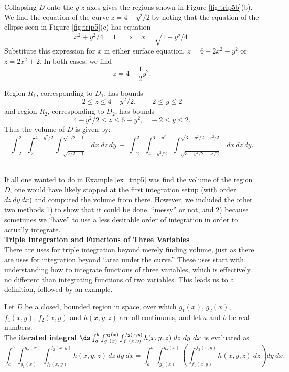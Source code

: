 {Collapsing $D$ onto the $y$-$z$ axes gives the regions shown in Figure \ref{fig:trip5b}(b). We find the equation of the curve $z=4-y^2/2$ by noting that the equation of the ellipse seen in Figure \ref{fig:trip5}(c) has equation 
$$x^2+y^2/4=1 \quad \Rightarrow \quad x = \sqrt{1-y^2/4}.$$  
Substitute this expression for $x$ in either surface equation, $z=6-2x^2-y^2$ or $z=2x^2+2$. In both cases, we find $$z=4-\frac12y^2.$$

Region $R_1$, corresponding to $D_1$, has bounds $$2\leq z\leq 4-y^2/2,\quad -2\leq y\leq 2$$ and region $R_2$, corresponding to $D_2$, has bounds $$4-y^2/2\leq z\leq 6-y^2,\quad -2\leq y\leq 2.$$ Thus the volume of $D$ is given by:
$$\int_{-2}^2\int_2^{4-y^2/2}\int_{-\sqrt{z/2-1}}^{\sqrt{z/2-1}}\ dx\ dz\ dy \ +\ \int_{-2}^2\int_{4-y^2/2}^{6-y^2}\int_{-\sqrt{3-y^2/2-z^2/2}}^{\sqrt{3-y^2/2-z^2/2}}\ dx\ dz\ dy.$$

}\\

If all one wanted to do in Example \ref{ex_trip5} was find the volume of the region $D$, one would have likely stopped at the first integration setup (with order $dz\ dy\ dx$) and computed the volume from there. However, we included the other two methods 1) to show that it could be done, ``messy'' or not, and 2) because sometimes we ``have'' to use a less desirable order of integration in order to actually integrate.\\

\noindent\textbf{\Large Triple Integration and Functions of Three Variables} \\

There are uses for triple integration beyond merely finding volume, just as there are uses for integration beyond ``area under the curve.'' These uses start with understanding how to integrate functions of three variables, which is effectively no different than integrating functions of two variables. This leads us to a definition, followed by an example.

{Let $D$ be a closed, bounded region in space, over which $g_1(x)$, $g_2(x)$, $f_1(x,y)$, $f_2(x,y)$ and $h(x,y,z)$ are all continuous, and let $a$ and $b$ be real numbers.\\

The \textbf{iterated integral} $\ds \int_a^b\int_{g_1(x)}^{g_2(x)}\int_{f_1(x,y)}^{f_2(x,y)} h(x,y,z)\ dz\ dy\ dx$ is evaluated as
\small
$$\int_a^b\int_{g_1(x)}^{g_2(x)}\int_{f_1(x,y)}^{f_2(x,y)} h(x,y,z)\ dz\ dy\ dx = \int_a^b\int_{g_1(x)}^{g_2(x)}\left(\int_{f_1(x,y)}^{f_2(x,y)} h(x,y,z)\ dz\right) dy\ dx.$$\normalsize
}

